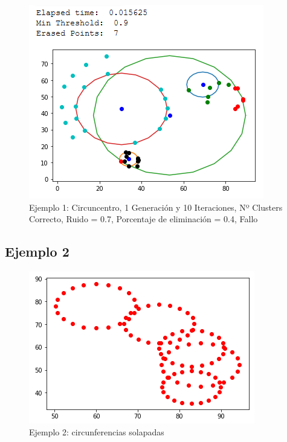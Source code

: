 \documentclass[conference,a4paper]{IEEEtran}
\begin{document}
\begin{figure}[H]
\centering
\includegraphics[scale=0.65]{Experimentacion/Ejemplo1/ej1_c_1_10_re_wrong}
\caption{Ejemplo 1: Circuncentro, 1 Generación y 10 Iteraciones,  Nº Clusters Correcto, Ruido = 0.7, Porcentaje de eliminación = 0.4, Fallo\\}
\end{figure}

\clearpage
\subsection{Ejemplo 2}

\begin{figure}[H]
\centering
\includegraphics[scale=0.8]{Experimentacion/Ejemplo2/Ejemplo2}
\caption{Ejemplo 2: circunferencias solapadas}
\end{figure}
\end{document}
